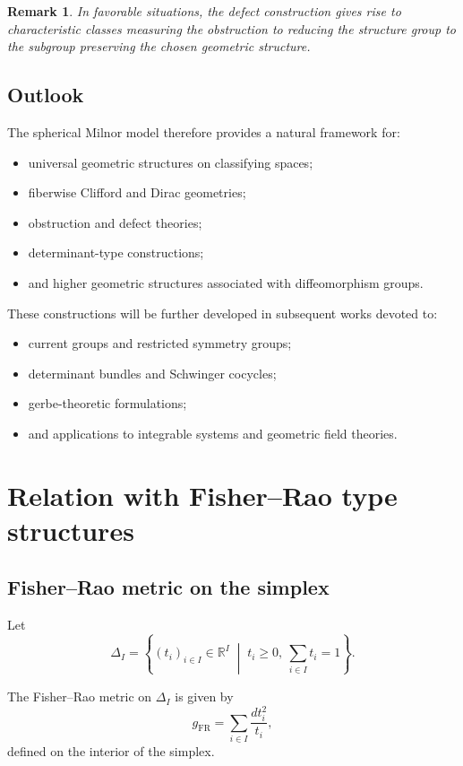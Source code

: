 \documentclass[11pt]{amsart}
\newtheorem{remark}[theorem]{Remark}
\begin{document}
\begin{remark}
In favorable situations, the defect construction gives rise to characteristic
classes measuring the obstruction to reducing the structure group to the
subgroup preserving the chosen geometric structure.
\end{remark}

\subsection{Outlook}

The spherical Milnor model therefore provides a natural framework for:
\begin{itemize}
\item universal geometric structures on classifying spaces;
\item fiberwise Clifford and Dirac geometries;
\item obstruction and defect theories;
\item determinant-type constructions;
\item and higher geometric structures associated with diffeomorphism groups.
\end{itemize}

These constructions will be further developed in subsequent works devoted to:
\begin{itemize}
\item current groups and restricted symmetry groups;
\item determinant bundles and Schwinger cocycles;
\item gerbe-theoretic formulations;
\item and applications to integrable systems and geometric field theories.
\end{itemize}


\appendix

\section{Relation with Fisher--Rao type structures}

\subsection{Fisher--Rao metric on the simplex}

Let
\[
\Delta_I
=
\left\{ (t_i)_{i\in I} \in \mathbb{R}^I \;\middle|\; t_i \ge 0,\ \sum_{i\in I} t_i = 1 \right\}.
\]

The Fisher--Rao metric on $\Delta_I$ is given by
\[
g_{\mathrm{FR}}
=
\sum_{i\in I} \frac{dt_i^2}{t_i},
\]
defined on the interior of the simplex.
\end{document}
